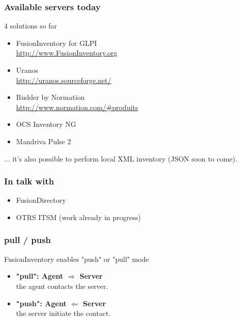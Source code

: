 \documentclass{beamer}
\begin{document}
\begin{frame}
    \frametitle{Available servers today}

    \begin{block}{4 solutions so far}
        \begin{itemize}
            \item FusionInventory for GLPI \\
            \url{http://www.FusionInventory.org}
            \item Uranos \\
            \url{http://uranos.sourceforge.net/}
            \item Rudder by Normation \\
            \url{http://www.normation.com/\#produits}
            \item OCS Inventory NG
            \item Mandriva Pulse 2

        \end{itemize}
        ... it's also possible to perform local XML inventory (JSON soon to come).
    \end{block}

\end{frame}

\begin{frame}
    \frametitle{In talk with}

    \begin{itemize}
    \item FusionDirectory
    \item OTRS ITSM (work already in progress)
    \end{itemize}
\end{frame}

\begin{frame}
    \frametitle{pull / push}

    \begin{block}{FusionInventory enables "push" or "pull" mode}
    \begin{itemize}
    \item \textbf{"pull": Agent $\Longrightarrow$ Server} \\
    the agent contacts the server.
    \item \textbf{"push": Agent $\Longleftarrow$ Server} \\
    the server initiate the contact.
    \end{itemize}
    \end{block}

\end{frame}
\end{document}
